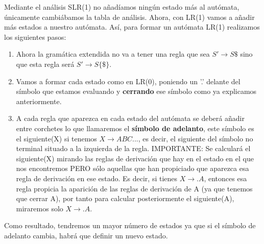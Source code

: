 \documentclass{apuntes}
\begin{document}
Mediante el análisis SLR(1) no añadíamos ningún estado más al autómata, únicamente cambiábamos la tabla de análisis. Ahora, con LR(1) vamos a añadir más estados a nuestro autómata. Así, para formar un autómata LR(1) realizamos los siguientes pasos:

\begin{enumerate}
\item Ahora la gramática extendida no va a tener una regla que sea $S' \rightarrow S\$$ sino que esta regla será $S' \rightarrow S\{\$\}$.
\item Vamos a formar cada estado como en LR(0), poniendo un '.' delante del símbolo que estamos evaluando y \textbf{cerrando} ese símbolo como ya explicamos anteriormente.
\item A cada regla que aparezca en cada estado del autómata se deberá añadir entre corchetes lo que llamaremos el \textbf{símbolo de adelanto}, este símbolo es el siguiente(X) si tenemos $X \rightarrow ABC...$, es decir, el siguiente del símbolo no terminal situado a la izquierda de la regla. IMPORTANTE: Se calculará el siguiente(X) mirando las reglas de derivación que hay en el estado en el que nos encontremos PERO sólo aquellas que han propiciado que aparezca esa regla de derivación en ese estado. Es decir, si tienes $X \rightarrow .A$, entonces esa regla propicia la aparición de las reglas de derivación de A (ya que tenemos que cerrar A), por tanto para calcular posteriormente el siguiente(A), miraremos solo $X \rightarrow .A$.
\end{enumerate}

Como resultado, tendremos un mayor número de estados ya que si el símbolo de adelanto cambia, habrá que definir un nuevo estado.
\end{document}
